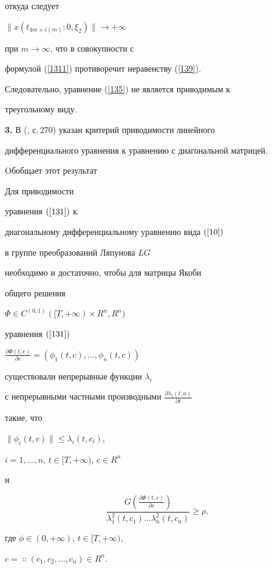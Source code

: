 откуда следует


$\|x(t_{4m+i(m)}:0,\xi_{2})\|\rightarrow +\infty$


при $m\rightarrow \infty$, что в совокупности с


формулой (\ref{1311}) противоречит неравенству (\ref{139}).


Следовательно, уравнение (\ref{135}) не является приводимым к


треугольному виду.


\medskip





{\bf 3.} В (\cite{BilTe}, с.\,270) указан критерий приводимости линейного


дифференциального уравнения к уравнению с диагональной матрицей.


Oбобщает этот результат





\begin{thm}


\label{th131}


Для приводимости


уравнения $(\ref{131})$ к


диагональному дифференциальному уравнению вида $(\ref{10})$


в группе преобразований Ляпунова $LG$


необходимо и достаточно, чтобы для матрицы Якоби


общего решения


$\Phi\in C^{(0,1)}([T,+\infty)\times R^{n},R^{n})$


уравнения $(\ref{131})$


$\frac{\partial\Phi(t,c)}{\partial c}=(\phi_{1}(t,c),\dotsc,\phi_{n}(t,c))$


существовали непрерывные функции $\lambda_{i}$


с непрерывными частными производными $\frac{\partial\lambda_{i}(t,a)}


{\partial t}$


такие, что


$\|\phi_{i}(t,c)\|\leq \lambda_{i}(t,c_{i})$,


$i=1,\dotsc,n$, $t\in [T,+\infty)$, $c\in R^{n}$


и


\begin{equation}


\label{usl1}


\frac{G(\frac{\partial \Phi(t,c)}{\partial c})}


{\lambda_{1}^{2}(t,c_{1})\dotsc


\lambda_{n}^{2}(t,c_{n})}\geq \rho,


\end{equation}


где $\phi\in(0,+\infty)$, $t\in [T,+\infty)$,


$c=\Colon(c_{1},c_{2},\dotsc,c_{n})\in R^{n}$.


\end{thm}





